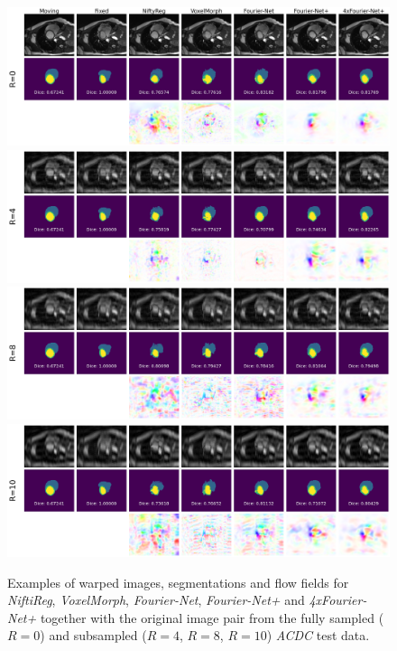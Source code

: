 
\begin{figure}[H]
	\centering
	\graphicspath{{images/}{\main/images/}}
	\includegraphics[width=\textwidth]{TestExamples_Mode0.png}
    	\includegraphics[width=\textwidth]{TestExamples_Mode1.png}
    	\includegraphics[width=\textwidth]{TestExamples_Mode2.png}
    	\includegraphics[width=\textwidth]{TestExamples_Mode3.png}	
	\caption{Examples of warped images, segmentations and flow fields for \emph{NiftiReg}, \emph{VoxelMorph}, \emph{Fourier-Net}, \emph{Fourier-Net+} and \emph{4xFourier-Net+} together with the original image pair from the fully sampled ($R=0$) and subsampled ($R=4$, $R=8$, $R=10$) \emph{ACDC} test data.}
	\label{fig:TestExamples}
\end{figure}


